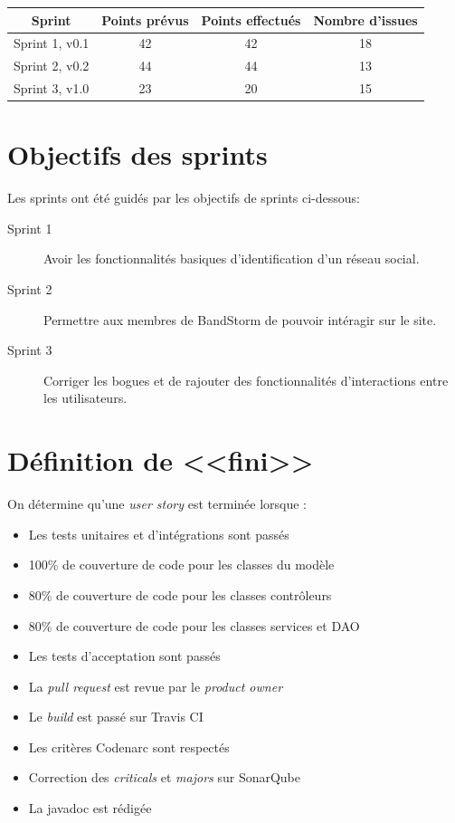 \documentclass[12pt,a4paper,oneside]{book}
\begin{document}
	\begin{tabular}{|c|c|c|c|}
		\hline
		\textbf{Sprint} &\textbf{ Points prévus} & \textbf{Points effectués }&\textbf{ Nombre d'issues}\\
		\hline
		Sprint 1, v0.1 &42& 42& 18\\
		\hline
		Sprint 2, v0.2 &44& 44& 13\\
		\hline
		Sprint 3, v1.0 &23& 20& 15\\
		\hline
	\end{tabular}
	\section{Objectifs des sprints}
	Les sprints ont été guidés par les objectifs de sprints ci-dessous:

\begin{description}
	\item[Sprint 1] Avoir les fonctionnalités basiques d’identification d’un réseau social. 
	\item[Sprint 2] Permettre aux membres de BandStorm de pouvoir intéragir sur le site.
	\item[Sprint 3] Corriger les bogues et de rajouter des fonctionnalités d'interactions entre les utilisateurs. 
\end{description}

\newpage
	\section{Définition de <<fini>>}
	On détermine qu'une \textit{user story} est terminée lorsque : 

	\begin{itemize}
		\item Les tests unitaires et d’intégrations sont passés
		\item 100\% de couverture de code pour les classes du modèle
		\item 80\% de couverture de code pour les classes contrôleurs
		\item 80\% de couverture de code pour les classes services et DAO 
		\item Les tests d’acceptation sont passés
		\item La \textit{pull request} est revue par le \textit{product owner}
		\item Le\textit{ build }est passé sur Travis CI
		\item Les critères Codenarc sont respectés 
		\item Correction des \textit{criticals} et \textit{majors} sur SonarQube
		\item La javadoc est rédigée 
	\end{itemize}
\end{document}
